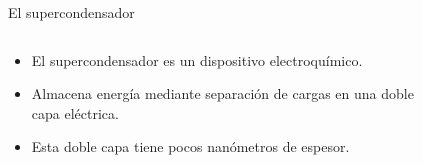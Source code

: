 \documentclass[aspectratio=169]{beamer}
\begin{document}
	\begin{frame}{El supercondensador}
		\begin{columns}
			\begin{column}{0.5\textwidth}
				\begin{itemize}
					\item<1-> El supercondensador es un dispositivo electroquímico.
					\item<2-> Almacena energía mediante separación de cargas en una doble capa eléctrica.
					\item<3-> Esta doble capa tiene pocos nanómetros de espesor.
				\end{itemize}
			\end{column}
			\begin{column}{0.5\textwidth}
				\begin{figure}[h!]
					\centering
\end{figure}
\end{column}
\end{columns}
\end{frame}
\end{document}
